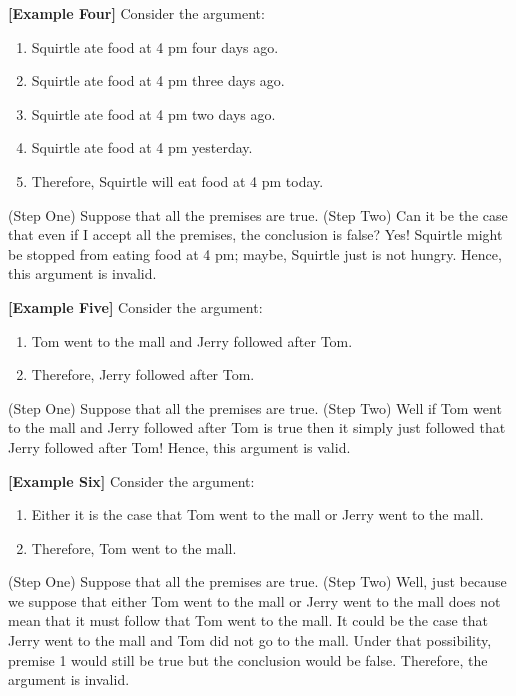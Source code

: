 \documentclass[
]{book}
\providecommand{\tightlist}{%
  \setlength{\itemsep}{0pt}\setlength{\parskip}{0pt}}
\begin{document}
\textbf{{[}Example Four{]}} Consider the argument:

\begin{enumerate}
\def\labelenumi{\arabic{enumi}.}
\tightlist
\item
  Squirtle ate food at 4 pm four days ago.
\item
  Squirtle ate food at 4 pm three days ago.
\item
  Squirtle ate food at 4 pm two days ago.
\item
  Squirtle ate food at 4 pm yesterday.
\item
  Therefore, Squirtle will eat food at 4 pm today.
\end{enumerate}

(Step One) Suppose that all the premises are true. (Step Two) Can it be the case that even if I accept all the premises, the conclusion is false? Yes! Squirtle might be stopped from eating food at 4 pm; maybe, Squirtle just is not hungry. Hence, this argument is invalid.

\textbf{{[}Example Five{]}} Consider the argument:

\begin{enumerate}
\def\labelenumi{\arabic{enumi}.}
\tightlist
\item
  Tom went to the mall and Jerry followed after Tom.
\item
  Therefore, Jerry followed after Tom.
\end{enumerate}

(Step One) Suppose that all the premises are true. (Step Two) Well if Tom went to the mall and Jerry followed after Tom is true then it simply just followed that Jerry followed after Tom! Hence, this argument is valid.

\textbf{{[}Example Six{]}} Consider the argument:

\begin{enumerate}
\def\labelenumi{\arabic{enumi}.}
\tightlist
\item
  Either it is the case that Tom went to the mall or Jerry went to the mall.
\item
  Therefore, Tom went to the mall.
\end{enumerate}

(Step One) Suppose that all the premises are true. (Step Two) Well, just because we suppose that either Tom went to the mall or Jerry went to the mall does not mean that it must follow that Tom went to the mall. It could be the case that Jerry went to the mall and Tom did not go to the mall. Under that possibility, premise 1 would still be true but the conclusion would be false. Therefore, the argument is invalid.
\end{document}
